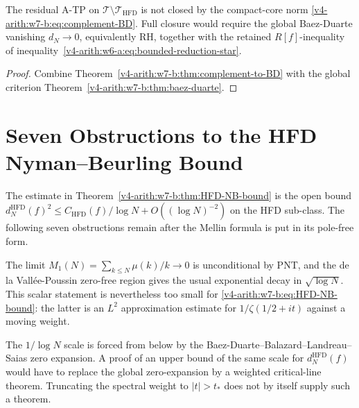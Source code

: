 \begin{corollary}
\label{v4-arith:w7-b:cor:irreducible-restricted-BD}
The residual A-TP on
\(\mathscr T\setminus\mathscr T_{\mathrm{HFD}}\)
is not closed by the compact-core norm
\eqref{v4-arith:w7-b:eq:complement-BD}. Full closure would require the
global Baez-Duarte vanishing \(d_N\to0\), equivalently RH, together
with the retained \(R[f]\)-inequality of
inequality~\eqref{v4-arith:w6-a:eq:bounded-reduction-star}.
\end{corollary}

\begin{proof}
Combine Theorem~\ref{v4-arith:w7-b:thm:complement-to-BD} with the global
criterion Theorem~\ref{v4-arith:w7-b:thm:baez-duarte}.
\end{proof}

\section{Seven Obstructions to the HFD Nyman--Beurling Bound}
\label{v4-arith:w7-b:obstruction-analysis}

The estimate in
Theorem~\ref{v4-arith:w7-b:thm:HFD-NB-bound} is the open bound
\(d_{N}^{\mathrm{HFD}}(f)^{2}\leq C_{\mathrm{HFD}}(f)/\log N+
O((\log N)^{-2})\) on the HFD sub-class. The following seven
obstructions remain after the Mellin formula is put in its pole-free
form.

\begin{remark}
\label{v4-arith:w7-b:rem:obstruction-1}
The limit \(M_{1}(N)=\sum_{k\leq N}\mu(k)/k\to0\) is unconditional by
PNT, and the de la Vall\'ee-Poussin zero-free region gives the usual
exponential decay in \(\sqrt{\log N}\). This scalar statement is
nevertheless too small for
\eqref{v4-arith:w7-b:eq:HFD-NB-bound}: the latter is an \(L^{2}\)
approximation estimate for \(1/\zeta(1/2+it)\) against a moving
weight.
\end{remark}

\begin{remark}
\label{v4-arith:w7-b:rem:obstruction-2}
The \(1/\log N\) scale is forced from below by the
Baez-Duarte--Balazard--Landreau--Saias zero expansion. A proof of an
upper bound of the same scale for
\(d_N^{\mathrm{HFD}}(f)\) would have to replace the global
zero-expansion by a weighted critical-line theorem. Truncating the
spectral weight to \(|t|>t_{\ast}\) does not by itself supply such a
theorem.
\end{remark}

